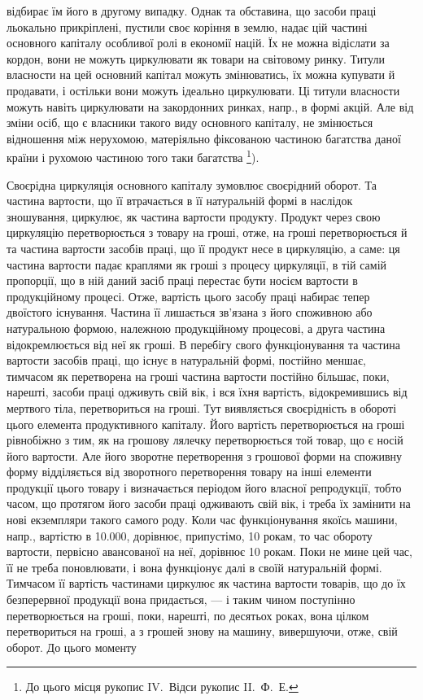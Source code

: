 \parcont{}  %
відбирає їм його в другому випадку. Однак та обставина, що засоби праці льокально прикріплені,
пустили своє коріння в землю, надає цій частині основного капіталу особливої ролі в економії націй.
Їх не можна відіслати за кордон, вони не можуть циркулювати як товари на світовому ринку. Титули
власности на цей основний капітал можуть змінюватись, їх можна купувати й продавати, і остільки вони
можуть ідеально
циркулювати. Ці титули власности можуть навіть циркулювати на закордонних ринках, напр., в формі
акцій. Але від зміни осіб, що є власники такого виду основного капіталу, не змінюється відношення
між нерухомою, матеріяльно фіксованою частиною багатства даної країни і рухомою частиною того таки
багатства \footnote{До цього місця рукопис IV.~Відси рукопис II.~Ф.~Е.}).

Своєрідна циркуляція основного капіталу зумовлює своєрідний оборот. Та частина вартости, що її
втрачається в її натуральній формі в наслідок зношування, циркулює, як частина вартости продукту.
Продукт через свою циркуляцію перетворюється з товару на гроші, отже, на гроші перетворюється й та
частина вартости засобів праці, що її продукт несе в циркуляцію, а саме: ця частина вартости падає
краплями як гроші з процесу циркуляції, в тій самій пропорції, що в ній даний засіб праці перестає
бути носієм вартости в продукційному процесі. Отже, вартість цього засобу праці набирає тепер
двоїстого існування. Частина її лишається зв’язана з його споживною або натуральною формою, належною
продукційному процесові, а друга частина відокремлюється від неї як гроші. В перебігу свого
функціонування та частина вартости засобів праці, що існує в натуральній формі, постійно меншає,
тимчасом як перетворена на гроші частина вартости постійно більшає, поки, нарешті, засоби праці
одживуть свій вік, і вся їхня вартість, відокремившись від мертвого тіла, перетвориться на гроші.
Тут виявляється своєрідність в обороті цього елемента продуктивного капіталу. Його вартість
перетворюється на гроші рівнобіжно з тим, як на грошову лялечку перетворюється той товар, що є носій
його вартости. Але його зворотне перетворення з грошової форми на споживну форму відділяється від
зворотного перетворення товару на інші елементи продукції цього товару і визначається періодом його
власної репродукції, тобто часом, що протягом його засоби праці одживають свій вік, і треба їх
замінити на нові екземпляри такого самого роду. Коли час функціонування якоїсь машини, напр.,
вартістю в \num{10.000}, дорівнює, припустімо, 10 рокам, то час обороту вартости, первісно
авансованої на неї, дорівнює 10 рокам. Поки не мине цей час, її не треба поновлювати, і вона
функціонує далі в своїй натуральній формі. Тимчасом її вартість частинами циркулює як частина
вартости товарів, що до їх безперервної продукції вона придається, — і таким чином поступінно
перетворюється на гроші, поки, нарешті, по десятьох роках, вона цілком перетвориться на гроші, а з
грошей знову на машину, вивершуючи, отже, свій оборот. До цього моменту
\parbreak{}  %

